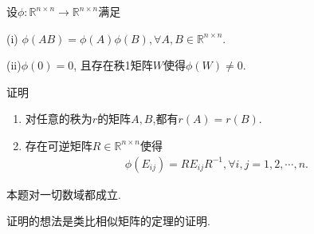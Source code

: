 \documentclass[../../main.tex]{subfiles}
\begin{document}
\begin{theorem}
设$\phi: \mathbb{R}^{n \times n} \to \mathbb{R}^{n \times n}$满足

(i) $\phi(AB) = \phi(A)\phi(B), \forall A,B \in \mathbb{R}^{n \times n}$.

(ii)$\phi(0) = 0$, 且存在秩1矩阵$W$使得$\phi(W) \neq 0$.

证明
\begin{enumerate}[(1)]
\item 对任意的秩为$r$的矩阵$A,B$,都有$r(A)=r(B).$

\item 存在可逆矩阵$R \in \mathbb{R}^{n \times n}$使得
\begin{align}
\phi(E_{ij}) = R E_{ij} R^{-1}, \forall i,j = 1,2,\cdots,n. \label{eq:23.81}
\end{align}
\end{enumerate}
\end{theorem}
\begin{note}
本题对一切数域都成立.

证明的想法是类比相似矩阵的定理的证明. 
\end{note}
\end{document}
